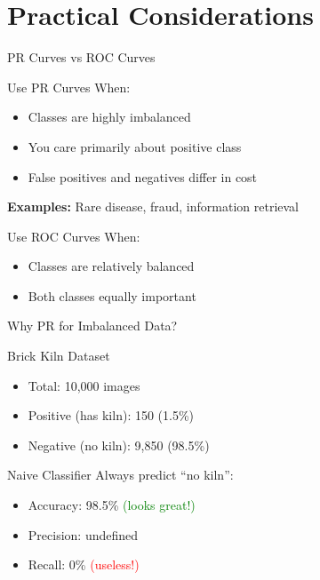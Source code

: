 \documentclass{beamer}
\begin{document}
\section{Practical Considerations}

\begin{frame}{PR Curves vs ROC Curves}
\begin{keypointsbox}{Use PR Curves When:}
\small
\begin{itemize}
    \item Classes are highly imbalanced
    \item You care primarily about positive class
    \item False positives and negatives differ in cost
\end{itemize}

\textbf{Examples:} Rare disease, fraud, information retrieval
\end{keypointsbox}

\vspace{0.15cm}

\begin{block}{Use ROC Curves When:}
\begin{itemize}
    \item Classes are relatively balanced
    \item Both classes equally important
\end{itemize}
\end{block}
\end{frame}

\begin{frame}{Why PR for Imbalanced Data?}
\begin{examplebox}{Brick Kiln Dataset}
\small
\begin{itemize}
    \item Total: 10,000 images
    \item Positive (has kiln): 150 (1.5\%)
    \item Negative (no kiln): 9,850 (98.5\%)
\end{itemize}
\end{examplebox}

\vspace{0.15cm}

\begin{alertblock}{Naive Classifier}
\small
Always predict ``no kiln'':
\begin{itemize}
    \item Accuracy: 98.5\% \textcolor{green}{(looks great!)}
    \item Precision: undefined
    \item Recall: 0\% \textcolor{red}{(useless!)}
\end{itemize}
\end{alertblock}
\end{frame}
\end{document}
